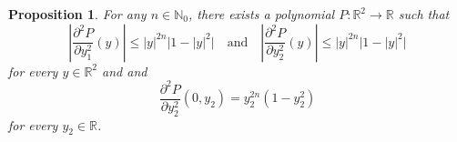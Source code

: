 \documentclass[a4paper]{article}
\newcommand{\R}{\mathbb{R}}
\newcommand{\N}{\mathbb{N}}
\newtheorem{proposition}[theorem]{Proposition}
\theoremstyle{definition}
\theoremstyle{remark}
\begin{document}
\begin{proposition} \label{prp:polynomial}
For any $n \in \N_0$, there exists a polynomial $P \colon \R^2 \to \R$ such
that
\begin{equation} \label{eq:second-derivatives-polynomial}
\left|\frac{\partial^2 P}{\partial y_1^2}(y)\right| \le |y|^{2n} \bigl|1 - |y|^2\bigr| \quad \text{and} \quad \left|\frac{\partial^2 P}{\partial y_2^2}(y)\right| \le |y|^{2n} \bigl|1 - |y|^2\bigr|
\end{equation}
for every $y \in \R^2$ and
and
\begin{equation} \label{eq:equality-polynomial}
\frac{\partial^2 P}{\partial y_2^2}(0, y_2) = y_2^{2n} (1 - y_2^2)
\end{equation}
for every $y_2 \in \R$.
\end{proposition}
\end{document}
